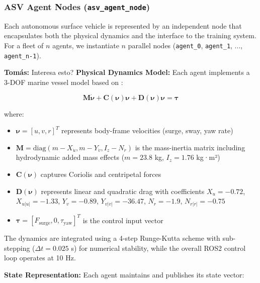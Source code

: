\documentclass[preprint,3p]{elsarticle}
\newcommand{\tcom}[1]{{ \color{blue}\textbf{Tomás:} #1}}
\begin{document}
\subsubsection{ASV Agent Nodes (\texttt{asv\_agent\_node})}

Each autonomous surface vehicle is represented by an independent node that encapsulates both the physical dynamics and the interface to the training system. For a fleet of $n$ agents, we instantiate $n$ parallel nodes (\texttt{agent\_0}, \texttt{agent\_1}, ..., \texttt{agent\_n-1}).

\vspace{1em}

\tcom{Interesa esto?}
\textbf{Physical Dynamics Model:} Each agent implements a 3-DOF marine vessel model based on \cite{fossen2011handbook}:

\begin{equation}
    \mathbf{M}\dot{\boldsymbol{\nu}} + \mathbf{C}(\boldsymbol{\nu})\boldsymbol{\nu} + \mathbf{D}(\boldsymbol{\nu})\boldsymbol{\nu} = \boldsymbol{\tau}
\end{equation}

where:
\begin{itemize}
    \item $\boldsymbol{\nu} = [u, v, r]^T$ represents body-frame velocities (surge, sway, yaw rate)
    \item $\mathbf{M} = \text{diag}(m - X_{\dot{u}}, m - Y_{\dot{v}}, I_z - N_{\dot{r}})$ is the mass-inertia matrix including hydrodynamic added mass effects ($m = 23.8$ kg, $I_z = 1.76$ kg·m²)
    \item $\mathbf{C}(\boldsymbol{\nu})$ captures Coriolis and centripetal forces
    \item $\mathbf{D}(\boldsymbol{\nu})$ represents linear and quadratic drag with coefficients $X_u = -0.72$, $X_{u|u|} = -1.33$, $Y_v = -0.89$, $Y_{v|v|} = -36.47$, $N_r = -1.9$, $N_{r|r|} = -0.75$
    \item $\boldsymbol{\tau} = [F_{\text{surge}}, 0, \tau_{\text{yaw}}]^T$ is the control input vector
\end{itemize}

The dynamics are integrated using a 4-step Runge-Kutta scheme with sub-stepping ($\Delta t = 0.025$ s) for numerical stability, while the overall ROS2 control loop operates at 10 Hz.

\vspace{1em}

\textbf{State Representation:} Each agent maintains and publishes its state vector:
\end{document}
